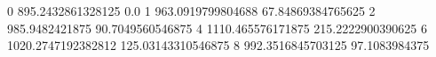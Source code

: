 0 895.2432861328125 0.0
1 963.0919799804688 67.84869384765625
2 985.9482421875 90.7049560546875
4 1110.465576171875 215.2222900390625
6 1020.2747192382812 125.03143310546875
8 992.3516845703125 97.1083984375
